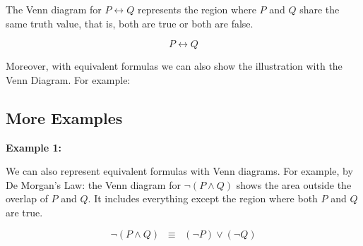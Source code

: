 \documentclass[12pt,a4paper,openany]{article}
\begin{document}
The Venn diagram for \(P \leftrightarrow Q\) represents the region where \(P\) and \(Q\) share the same truth value, 
that is, both are true or both are false.  

\[
P \leftrightarrow Q
\]

\begin{center}
\end{center}

Moreover, with equivalent formulas we can also show the illustration with the Venn Diagram. For example:

\subsection{More Examples}\label{more-example}

\textbf{Example 1:}  

We can also represent equivalent formulas with Venn diagrams. For example, by De Morgan's Law: the Venn diagram for \(\neg (P \wedge Q)\) shows the area outside the overlap of \(P\) and \(Q\). It includes everything except the region where both \(P\) and \(Q\) are true.

\[
\neg (P \wedge Q) \;\;\equiv\;\; (\neg P) \vee (\neg Q)
\]

\begin{center}
\end{center}
\end{document}
